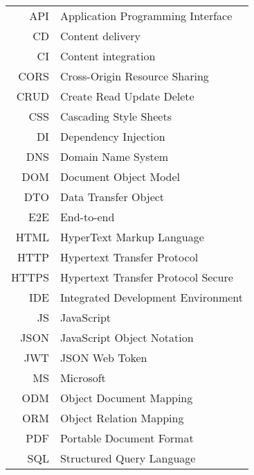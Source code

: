 \begin{longtable}{rl}
API & Application Programming Interface\\
CD & Content delivery\\
CI & Content integration\\
CORS & Cross-Origin Resource Sharing\\
CRUD & Create Read Update Delete\\
CSS & Cascading Style Sheets\\
DI & Dependency Injection\\
DNS & Domain Name System\\
DOM & Document Object Model\\
DTO & Data Transfer Object\\
E2E & End-to-end\\
HTML & HyperText Markup Language\\
HTTP & Hypertext Transfer Protocol\\
HTTPS & Hypertext Transfer Protocol Secure\\
IDE & Integrated Development Environment\\
JS & JavaScript\\
JSON & JavaScript Object Notation\\
JWT & JSON Web Token\\
MS & Microsoft\\
ODM & Object Document Mapping\\
ORM & Object Relation Mapping\\
PDF & Portable Document Format\\
SQL & Structured Query Language\\

\end{longtable}
